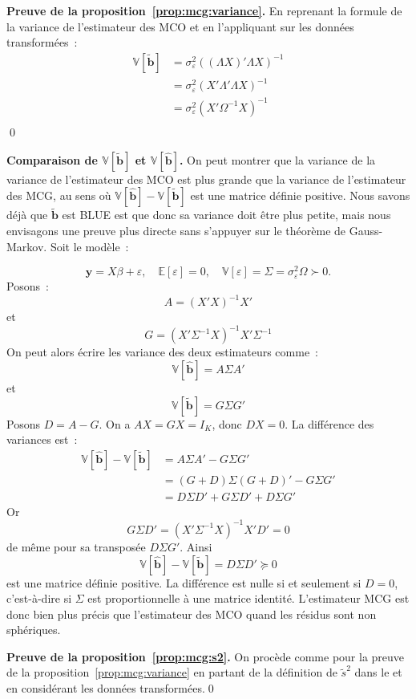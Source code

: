 \documentclass[10pt]{beamer}
\begin{document}
\begin{notes}

  \textbf{Preuve de la proposition~\ref{prop:mcg:variance}.} En reprenant la formule de la variance de l'estimateur des MCO et en l'appliquant sur les données transformées~:
  \[
    \begin{split}
      \mathbb V \left[\tilde{\mathbf b}\right] &= \sigma_{\varepsilon}^2\left((\Lambda X)'\Lambda X  \right)^{-1}\\
                                                &= \sigma_{\varepsilon}^2\left(X'\Lambda'\Lambda X  \right)^{-1}\\
                                                &= \sigma_{\varepsilon}^2\left(X'\Omega^{-1} X \right)^{-1}\\
    \end{split}
  \]
  \qed

  \bigskip

  \textbf{Comparaison de $\mathbb V [\tilde{\mathbf b}]$
    et $\mathbb V [\hat{\mathbf b}]$.} On peut montrer que la
  variance de la variance de l'estimateur des MCO est plus grande que
  la variance de l'estimateur des MCG, au sens
  où $\mathbb V [\hat{\mathbf b}]-\mathbb V [\tilde{\mathbf b}]$ est
  une matrice définie positive. Nous savons déjà
  que $\tilde{\mathbf b}$ est BLUE est que donc sa variance doit être
  plus petite, mais nous envisagons une preuve plus directe sans
  s'appuyer sur le théorème de Gauss-Markov. Soit le modèle~:

  \[
\mathbf y=X\beta+\varepsilon,\quad \mathbb E[\varepsilon]=0,\quad \mathbb V[\varepsilon]=\Sigma = \sigma_{\varepsilon}^2\Omega\succ 0.
\]
Posons~:
\[
  A = (X'X)^{-1}X'
\]
et
\[
  G = (X'\Sigma^{-1}X)^{-1}X'\Sigma^{-1}
\]
On peut alors écrire les variance des deux estimateurs comme~:
\[
\mathbb V[\hat{\mathbf b}] = A\Sigma A'
\]
et
\[
\mathbb V[\tilde{\mathbf b}] = G\Sigma G'
\]
Posons \(D=A-G\). On a \(AX=GX=I_K\), donc \(DX=0\). La différence des variances est~:
\[
  \begin{split}
    \mathbb V[\hat{\mathbf b}]-\mathbb V[\tilde{\mathbf b}] &= A\Sigma A' - G\Sigma G'\\
&= (G+D)\Sigma(G+D)' - G\Sigma G'\\
&= D\Sigma D' + G\Sigma D' + D\Sigma G'
  \end{split}
\]
Or
\[
G\Sigma D' = (X'\Sigma^{-1}X)^{-1}X'D' = 0
\]
de même pour sa transposée $D\Sigma G'$. Ainsi
\[
  \mathbb V[\hat{\mathbf b}]-\mathbb V[\tilde{\mathbf b}] = D\Sigma D' \succeq 0
\]
est une matrice définie positive. La différence est nulle si et
seulement si $D=0$, c'est-à-dire si $\Sigma$ est proportionnelle à une
matrice identité. L'estimateur MCG est donc bien plus précis que
l'estimateur des MCO quand les résidus sont non sphériques.

\bigskip

\textbf{Preuve de la proposition~\ref{prop:mcg:s2}.} On procède comme
pour la preuve de la proposition~\ref{prop:mcg:variance} en partant de
la définition de $\tilde{s}^2$ dans le  et
en considérant les données transformées.\qed

\end{notes}
\end{document}

